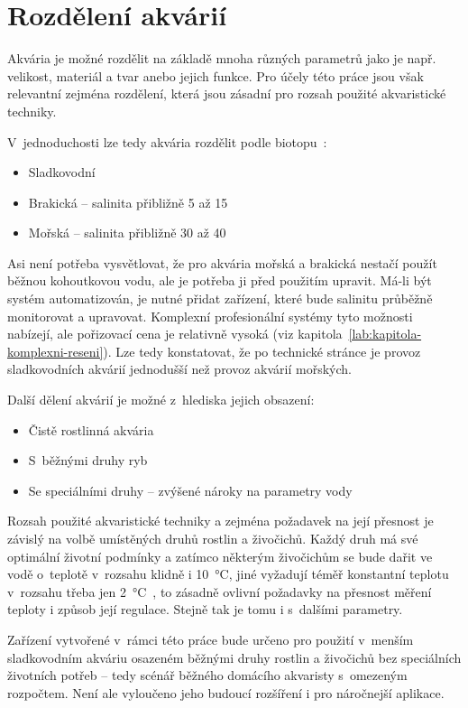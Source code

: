 \section{Rozdělení akvárií}
Akvária je možné rozdělit na základě mnoha různých parametrů jako je např. velikost, materiál a tvar anebo jejich funkce. Pro účely této práce jsou však relevantní zejména rozdělení, která jsou zásadní pro rozsah použité akvaristické techniky. 

V~jednoduchosti lze tedy akvária rozdělit podle biotopu~\cite{haskova_bakalarska2011}:
\begin{itemize}
    \item Sladkovodní
    \item Brakická -- salinita přibližně 5 až \qty{15}{\permille}
    \item Mořská -- salinita přibližně 30 až \qty{40}{\permille}
\end{itemize}

Asi není potřeba vysvětlovat, že pro akvária mořská a brakická nestačí použít běžnou kohoutkovou vodu, ale je potřeba ji před použitím upravit. Má-li být systém automatizován, je nutné přidat zařízení, které bude salinitu průběžně monitorovat a upravovat. Komplexní profesionální systémy tyto možnosti nabízejí, ale pořizovací cena je relativně vysoká (viz kapitola~\ref{lab:kapitola-komplexni-reseni}). Lze tedy konstatovat, že po technické stránce je provoz sladkovodních akvárií jednodušší než provoz akvárií mořských. 

Další dělení akvárií je možné z~hlediska jejich obsazení:
\begin{itemize}
    \item Čistě rostlinná akvária
    \item S~běžnými druhy ryb
    \item Se speciálními druhy -- zvýšené nároky na parametry vody
\end{itemize}
Rozsah použité akvaristické techniky a zejména požadavek na její přesnost je závislý na volbě umístěných druhů rostlin a živočichů. Každý druh má své optimální životní podmínky a zatímco některým živočichům se bude dařit ve vodě o~teplotě v~rozsahu klidně i \qty{10}{\degreeCelsius}, jiné vyžadují téměř konstantní teplotu v~rozsahu třeba jen \qty{2}{\degreeCelsius}~\cite{MusilLibor2018Isps}, to zásadně ovlivní požadavky na přesnost měření teploty i způsob její regulace. Stejně tak je tomu i s~dalšími parametry.

Zařízení vytvořené v~rámci této práce bude určeno pro použití v~menším sladkovodním akváriu osazeném běžnými druhy rostlin a živočichů bez speciálních životních potřeb -- tedy scénář běžného domácího akvaristy s~omezeným rozpočtem. Není ale vyloučeno jeho budoucí rozšíření i pro náročnejší aplikace.